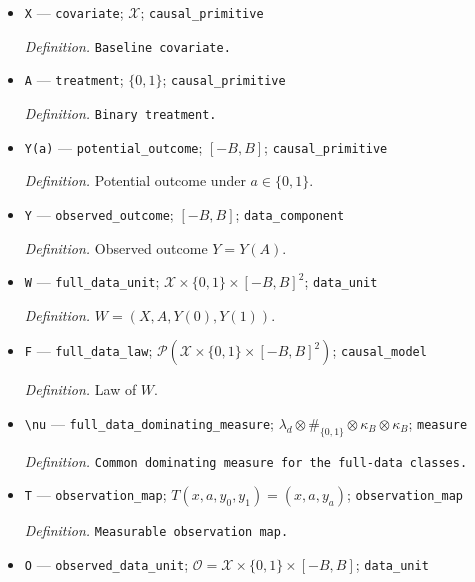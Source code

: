 \documentclass{article}
\begin{document}
\begin{itemize}
  \par\smallskip\noindent\emph{Definition.} \(\kappa_B=\lambda_{[-B,B]}+\delta_{-B}+\delta_B\).
  \item \texttt{X} --- \texttt{covariate}; \(\mathcal X\); \texttt{causal\_\allowbreak{}primitive}
  \par\smallskip\noindent\emph{Definition.} \texttt{Baseline covariate.}
  \item \texttt{A} --- \texttt{treatment}; \(\{0,1\}\); \texttt{causal\_\allowbreak{}primitive}
  \par\smallskip\noindent\emph{Definition.} \texttt{Binary treatment.}
  \item \texttt{Y(a)} --- \texttt{potential\_\allowbreak{}outcome}; \([-B,B]\); \texttt{causal\_\allowbreak{}primitive}
  \par\smallskip\noindent\emph{Definition.} Potential outcome under \(a\in\{0,1\}\).
  \item \texttt{Y} --- \texttt{observed\_\allowbreak{}outcome}; \([-B,B]\); \texttt{data\_\allowbreak{}component}
  \par\smallskip\noindent\emph{Definition.} Observed outcome \(Y=Y(A)\).
  \item \texttt{W} --- \texttt{full\_\allowbreak{}data\_\allowbreak{}unit}; \(\mathcal X\times\{0,1\}\times[-B,B]^2\); \texttt{data\_\allowbreak{}unit}
  \par\smallskip\noindent\emph{Definition.} \(W=(X,A,Y(0),Y(1))\).
  \item \texttt{F} --- \texttt{full\_\allowbreak{}data\_\allowbreak{}law}; \(\mathcal P(\mathcal X\times\{0,1\}\times[-B,B]^2)\); \texttt{causal\_\allowbreak{}model}
  \par\smallskip\noindent\emph{Definition.} Law of \(W\).
  \item \texttt{\textbackslash{}\allowbreak{}nu} --- \texttt{full\_\allowbreak{}data\_\allowbreak{}dominating\_\allowbreak{}measure}; \(\lambda_d\otimes\#_{\{0,1\}}\otimes\kappa_B\otimes\kappa_B\); \texttt{measure}
  \par\smallskip\noindent\emph{Definition.} \texttt{Common dominating measure for the full-\allowbreak{}data classes.}
  \item \texttt{T} --- \texttt{observation\_\allowbreak{}map}; \(T(x,a,y_0,y_1)=(x,a,y_a)\); \texttt{observation\_\allowbreak{}map}
  \par\smallskip\noindent\emph{Definition.} \texttt{Measurable observation map.}
  \item \texttt{O} --- \texttt{observed\_\allowbreak{}data\_\allowbreak{}unit}; \(\mathcal O=\mathcal X\times\{0,1\}\times[-B,B]\); \texttt{data\_\allowbreak{}unit}

\end{itemize}
\end{document}
